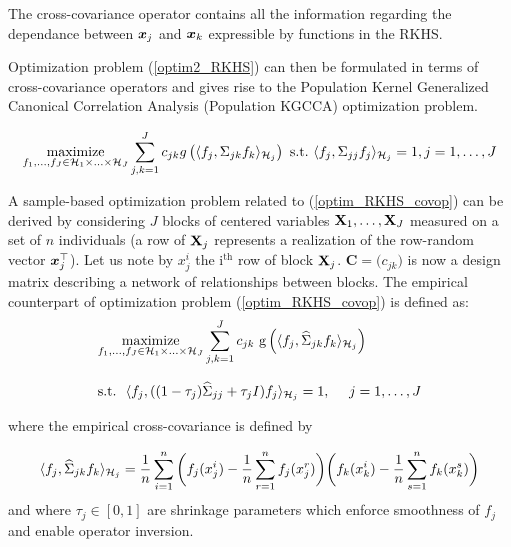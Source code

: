 \documentclass[
]{jss}
\begin{document}
The cross-covariance operator contains all the information regarding the
dependance between \(\boldsymbol{x}_j\) and \(\boldsymbol{x}_k\) expressible by functions in
the RKHS.

Optimization problem (\ref{optim2_RKHS}) can then be formulated in terms
of cross-covariance operators and gives rise to the Population Kernel
Generalized Canonical Correlation Analysis (Population KGCCA)
optimization problem.

\begin{equation} 
 \underset{f_1, \ldots, f_J \in \mathcal{H}_1 \times \ldots
\times \mathcal{H}_J }{\text{maximize}}  \displaystyle  \sum_{j, k = 1}^J c_{jk} g \left(\langle f_j, \Sigma_{jk}f_k \rangle_{\mathcal{H}_j}\right)
\mathrm{~s.t.~} \langle f_j, \Sigma_{jj}f_j \rangle_{\mathcal{H}_j}=1, j =1, \ldots, J 
\label{optim_RKHS_covop}
\end{equation}

A sample-based optimization problem related to (\ref{optim_RKHS_covop})
can be derived by considering \(J\) blocks of centered variables
\(\mathbf{X}_1, \ldots, \mathbf{X}_J\) measured on a set of \(n\) individuals (a row of
\(\mathbf{X}_j\) represents a realization of the row-random vector
\(\boldsymbol{x}_j^\top\)). Let us note by \(x_j^i\) the \(\text{i}^\text{th}\)
row of block \(\mathbf{X}_j\). \(\mathbf{C}=\big(c_{jk}\big)\) is now a design
matrix describing a network of relationships between blocks. The
empirical counterpart of optimization problem (\ref{optim_RKHS_covop})
is defined as: \begin{equation} 
\begin{array}{ll} \underset{f_1, \ldots, f_J \in \mathcal{H}_1 \times \ldots
\times \mathcal{H}_J }{\text{maximize}} \displaystyle \sum_{j, k = 1}^J c_{jk} \text{
g} \left(\langle f_j, \widehat{\Sigma}_{jk}f_k
\rangle_{\mathcal{H}_j}\right)\\\\ \mathrm{s.t.~~} \langle f_j,
((1-\tau_j)\widehat{\Sigma}_{jj} + \tau_j I)f_j \rangle_{\mathcal{H}_j}=1,
\text{~~~~} j =1, \ldots, J \\
\end{array}
\label{optim_RKHS_covop_emp}
\end{equation}

where the empirical cross-covariance is defined by

\begin{equation} \langle f_j, \widehat{\Sigma}_{jk}f_k
\rangle_{\mathcal{H}_j} = \frac{1}{n}\sum_{i=1}^n\bigg(f_j(x_j^i) -
\frac{1}{n}\sum_{r=1}^n f_j(x_j^r)\bigg)\bigg(f_k(x_k^i) -
\frac{1}{n}\sum_{s=1}^n f_k(x_k^s)\bigg)
\label{emp_covariance}
\end{equation} and where \(\tau_j \in [0, 1]\) are shrinkage parameters
which enforce smoothness of \(f_j\) and enable operator inversion.
\end{document}
